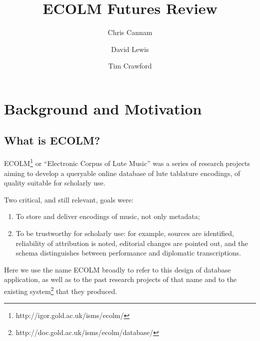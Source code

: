 \documentclass[sigconf, nonacm=true]{acmart}
\begin{document}
\title{ECOLM Futures Review}

\author{Chris Cannam}

\author{David Lewis}

\author{Tim Crawford}

\maketitle
\begin{sloppypar}
  
  \section{Background and Motivation}

  \subsection{What is ECOLM?}

  ECOLM\footnote{http://igor.gold.ac.uk/isms/ecolm/} or ``Electronic
  Corpus of Lute Music'' was a series of research projects aiming to
  develop a queryable online database of lute tablature encodings, of
  quality suitable for scholarly use.

  Two critical, and still relevant, goals were:
  
  \begin{enumerate}
  \item To store and deliver encodings of music, not only metadata;
  \item To be trustworthy for scholarly use: for example, sources are
    identified, reliability of attribution is noted, editorial changes
    are pointed out, and the schema distinguishes between performance
    and diplomatic transcriptions.
  \end{enumerate}
  
  Here we use the name ECOLM broadly to refer to this design of
  database application, as well as to the past research projects of
  that name and to the existing
  system\footnote{http://doc.gold.ac.uk/isms/ecolm/database/} that
  they produced.


\end{sloppypar}
\end{document}
